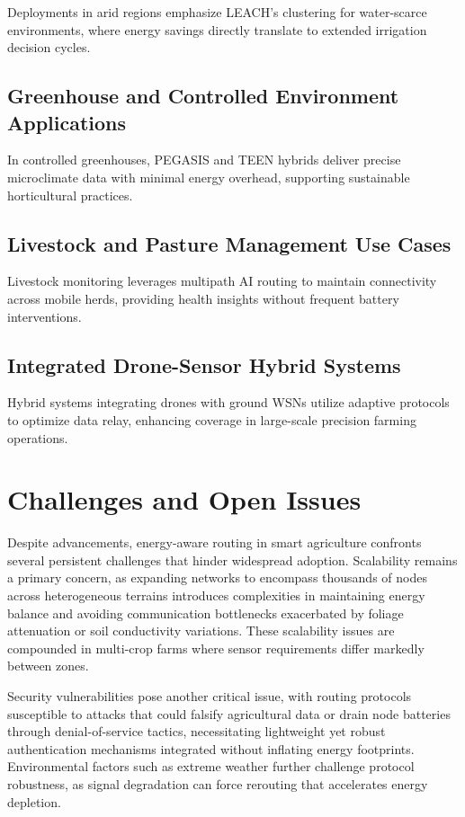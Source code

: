 \documentclass[12pt]{article}
\begin{document}
Deployments in arid regions emphasize LEACH's clustering for water-scarce environments, where energy savings directly translate to extended irrigation decision cycles.

\subsection{Greenhouse and Controlled Environment Applications}

In controlled greenhouses, PEGASIS and TEEN hybrids deliver precise microclimate data with minimal energy overhead, supporting sustainable horticultural practices.

\subsection{Livestock and Pasture Management Use Cases}

Livestock monitoring leverages multipath AI routing to maintain connectivity across mobile herds, providing health insights without frequent battery interventions.

\subsection{Integrated Drone-Sensor Hybrid Systems}

Hybrid systems integrating drones with ground WSNs utilize adaptive protocols to optimize data relay, enhancing coverage in large-scale precision farming operations.

\section{Challenges and Open Issues}

Despite advancements, energy-aware routing in smart agriculture confronts several persistent challenges that hinder widespread adoption. Scalability remains a primary concern, as expanding networks to encompass thousands of nodes across heterogeneous terrains introduces complexities in maintaining energy balance and avoiding communication bottlenecks exacerbated by foliage attenuation or soil conductivity variations. These scalability issues are compounded in multi-crop farms where sensor requirements differ markedly between zones.

Security vulnerabilities pose another critical issue, with routing protocols susceptible to attacks that could falsify agricultural data or drain node batteries through denial-of-service tactics, necessitating lightweight yet robust authentication mechanisms integrated without inflating energy footprints. Environmental factors such as extreme weather further challenge protocol robustness, as signal degradation can force rerouting that accelerates energy depletion.
\end{document}
